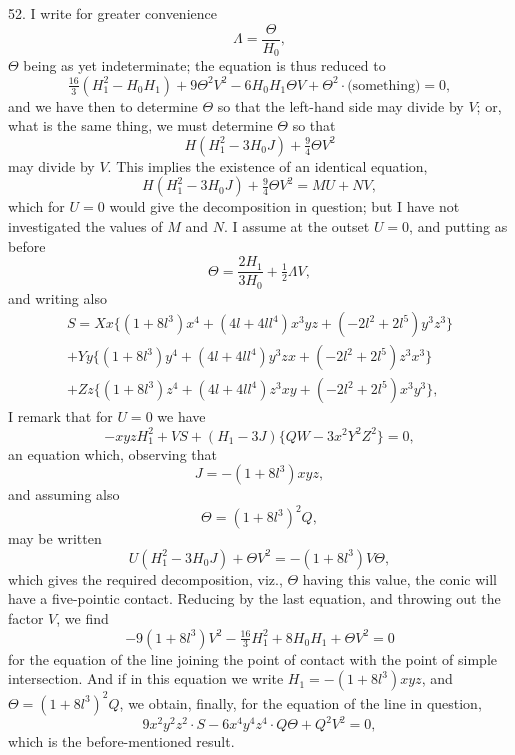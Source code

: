 \documentclass[11pt,a4paper]{book}
\begin{document}
52. I write for greater convenience
\[
\Lambda=\frac{\Theta}{H_0},
\]
$\Theta$ being as yet indeterminate; the equation is thus reduced to
\[
\tfrac{16}{3}(H_1^2-H_0H_1)+9\Theta^2V^2-6H_0H_1\Theta V+\Theta^2\cdot\text{(something)}=0,
\]
and we have then to determine $\Theta$ so that the left-hand side may divide by $V$; or, what is the same thing, we must determine $\Theta$ so that
\[
H(H_1^2-3H_0J)+\tfrac{9}{4}\Theta V^2
\]
may divide by $V$. This implies the existence of an identical equation,
\[
H(H_1^2-3H_0J)+\tfrac{9}{4}\Theta V^2=MU+NV,
\]
which for $U=0$ would give the decomposition in question; but I have not investigated the values of $M$ and $N$. I assume at the outset $U=0$, and putting as before
\[
\Theta=\frac{2H_1}{3H_0}+\tfrac{1}{2}\Lambda V,
\]
and writing also
\begin{multline*}
S=Xx\{(1+8l^3)x^4+(4l+4ll^4)x^3yz+(-2l^2+2l^5)y^3z^3\}\\
+Yy\{(1+8l^3)y^4+(4l+4ll^4)y^3zx+(-2l^2+2l^5)z^3x^3\}\\
+Zz\{(1+8l^3)z^4+(4l+4ll^4)z^3xy+(-2l^2+2l^5)x^3y^3\},
\end{multline*}
I remark that for $U=0$ we have
\[
-xyzH_1^2+VS+(H_1-3J)\{QW-3x^2Y^2Z^2\}=0,
\]
an equation which, observing that
\[
J=-(1+8l^3)xyz,
\]
and assuming also
\[
\Theta=(1+8l^3)^2Q,
\]
may be written
\[
U(H_1^2-3H_0J)+\Theta V^2=-(1+8l^3)V\Theta,
\]
which gives the required decomposition, viz., $\Theta$ having this value, the conic will have a five-pointic contact. Reducing by the last equation, and throwing out the factor $V$, we find
\[
-9(1+8l^3)V^2-\tfrac{16}{3}H_1^2+8H_0H_1+\Theta V^2=0
\]
for the equation of the line joining the point of contact with the point of simple intersection. And if in this equation we write $H_1=-(1+8l^3)xyz$, and $\Theta=(1+8l^3)^2Q$, we obtain, finally, for the equation of the line in question,
\[
9x^2y^2z^2\cdot S-6x^4y^4z^4\cdot Q\Theta+Q^2V^2=0,
\]
which is the before-mentioned result.
\end{document}
